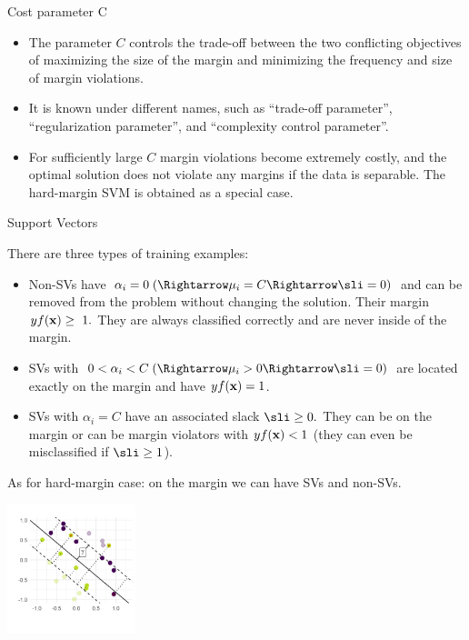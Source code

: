 \documentclass[11pt,compress,t,notes=noshow, xcolor=table]{beamer}
\begin{document}
\begin{vbframe}{Cost parameter C}

  \begin{itemize}
    \item The parameter $C$ controls the trade-off between the two conflicting
    objectives of maximizing the size of the margin and minimizing the frequency and size of margin
    violations.
    \item It is known under different names, such as \enquote{trade-off parameter}, \enquote{regularization parameter},
    and \enquote{complexity control parameter}.
    \item   For sufficiently large $C$ margin violations become extremely costly,
  and the optimal solution does not violate any margins if the
  data is separable. The hard-margin SVM is obtained as a special case.
  \end{itemize}
\end{vbframe}

\begin{vbframe}{Support Vectors}

\begin{small}
  There are three types of training examples:


\begin{itemize}
    \item Non-SVs have $\alpha_i = 0\; (\Rightarrow \mu_i = C \Rightarrow \sli = 0)$ and can be
    removed from the problem without changing the solution. Their margin $yf(\mathbf{x}) \geq ~ 1.$ 
    They are always classified correctly and are never inside of the margin. 
    
    \item SVs with $0 < \alpha_i < C\; (\Rightarrow \mu_i > 0 \Rightarrow \sli = 0)$ are located exactly on the
    margin and have $yf(\mathbf{x})=1$. 
    \item SVs with $\alpha_i = C$ have an associated
     slack $\sli \geq 0.$ They can be on the margin or can be margin violators with $yf(\mathbf{x}) < 1$ (they can even be misclassified if $\sli \geq 1$).
\end{itemize}
As for hard-margin case: on the margin we can have SVs and non-SVs.
\vspace{-0.6cm}
\begin{center}
\includegraphics[width = 0.28\textwidth ]{figure/soft_margin_svs.png} \\
\end{center}
\end{small}
\end{vbframe}
\end{document}
